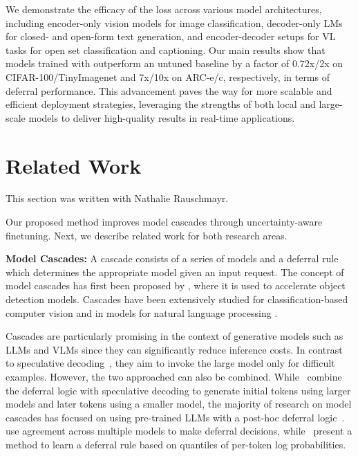 We demonstrate the efficacy of the \loss loss across various model architectures, including encoder-only vision models for image classification, decoder-only LMs for closed- and open-form text generation, and encoder-decoder setups for VL tasks for open set classification and captioning. Our main results show that models trained with \loss outperform an untuned baseline by a factor of 0.72x/2x on CIFAR-100/TinyImagenet and 7x/10x on ARC-e/c, respectively, in terms of deferral performance. This advancement paves the way for more scalable and efficient deployment strategies, leveraging the strengths of both local and large-scale models to deliver high-quality results in real-time applications.


\section{Related Work} \label{sec:related-word}

\begin{contriback}
This section was written with Nathalie Rauschmayr.
\end{contriback}


\sloppy
Our proposed method improves model cascades through uncertainty-aware finetuning. Next, we describe related work for both research areas.

\textbf{Model Cascades:} 
A cascade consists of a series of models and a deferral rule which determines the appropriate model given an input request. The concept of model cascades has first been proposed by \citet{990517}, where it is used to accelerate object detection models. Cascades have been extensively studied for classification-based computer vision \citep{Wang2017IDKCF, pmlr-v31-trapeznikov13a, Bolukbasi2017AdaptiveNN, NEURIPS2023_1f09e1ee} and in models for natural language processing \citep{dohan2022language, mamou2022tangobertreducinginferencecost, varshney-baral-2022-model}. 

Cascades are particularly promising in the context of generative models such as LLMs and VLMs since they can significantly reduce inference costs. In contrast to speculative decoding~\citep{leviathan2023fast}, they aim to invoke the large model only for difficult examples. However, the two approached can also be combined. While~\citet{chen2024cascade} combine the deferral logic with speculative decoding to generate initial tokens using larger models and later tokens using a smaller model, the majority of research on model cascades has focused on using pre-trained LLMs with a post-hoc deferral logic~\citep{NEURIPS2022_bc8f76d9, NEURIPS2023_1f09e1ee, yue2024large}. \citet{kolawole2024agreementbasedcascadingefficientinference} use agreement across multiple models to make deferral decisions, while~\citet{gupta2024languagemodelcascadestokenlevel} present a method to learn a deferral rule based on quantiles of per-token log probabilities. 

